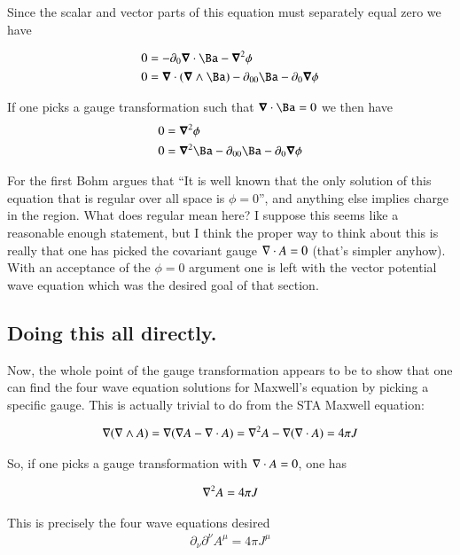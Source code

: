 \documentclass{article}
\begin{document}
Since the scalar and vector parts of this equation must separately equal zero we have

\begin{align*}
0 &= - \partial_0 \spacegrad \cdot {\Ba} - \spacegrad^2 \phi \\
0 &= \spacegrad \cdot (\spacegrad \wedge \Ba) - \partial_{00}{\Ba} - \partial_0 \spacegrad \phi  \\
\end{align*}

If one picks a gauge transformation such that $\spacegrad \cdot \Ba = 0$ we then have
\begin{align*}
0 &= \spacegrad^2 \phi \\
0 &= \spacegrad^2 \Ba - \partial_{00}{\Ba} - \partial_0 \spacegrad \phi  \\
\end{align*}

For the first Bohm argues that ``It is well known that the only solution of this equation that is regular over all space is $\phi = 0$'', and anything else implies charge in the region.  What does regular mean here?  I suppose this seems like a reasonable enough statement, but I think the proper way to think about this is really that one has picked the covariant gauge $\nabla \cdot A = 0$ (that's simpler anyhow).  With an acceptance of the $\phi =0$ argument one is left with the vector potential wave equation which was the desired goal of that section.

\subsection{ Doing this all directly. }

Now, the whole point of the gauge transformation appears to be to show that one can find the four wave equation solutions for 
Maxwell's equation by picking a specific gauge.  This is actually trivial to do from the STA Maxwell equation:

\begin{align*}
\nabla (\nabla \wedge A) = \nabla( \nabla A - \nabla \cdot A ) = \nabla^2 A - \nabla (\nabla \cdot A) = 4 \pi J
\end{align*}

So, if one picks a gauge transformation with $\nabla \cdot A = 0$, one has

\begin{align*}
\nabla^2 A = 4 \pi J
\end{align*}

This is precisely the four wave equations desired
\begin{align*}
\partial_\nu\partial^\nu A^\mu = 4 \pi J^\mu
\end{align*}
\end{document}
